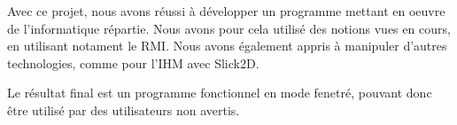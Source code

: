 Avec ce projet, nous avons réussi à développer un programme mettant en oeuvre de l'informatique répartie. Nous avons pour cela utilisé des notions vues en cours, en utilisant notament le RMI. Nous avons également appris à manipuler d'autres technologies, comme pour l'IHM avec Slick2D.

Le résultat final est un programme fonctionnel en mode fenetré, pouvant donc être utilisé par des utilisateurs non avertis. 